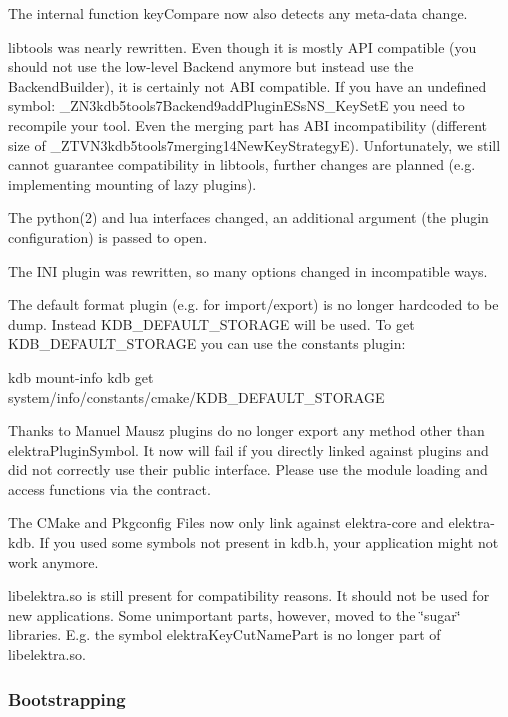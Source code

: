 The internal function {\ttfamily key\+Compare} now also detects any meta-\/data change.

libtools was nearly rewritten. Even though it is mostly A\+P\+I compatible (you should not use the low-\/level {\ttfamily Backend} anymore but instead use the {\ttfamily Backend\+Builder}), it is certainly not A\+B\+I compatible. If you have an undefined symbol\+: {\ttfamily \+\_\+\+Z\+N3kdb5tools7\+Backend9add\+Plugin\+E\+Ss\+N\+S\+\_\+Key\+Set\+E} you need to recompile your tool. Even the merging part has A\+B\+I incompatibility (different size of {\ttfamily \+\_\+\+Z\+T\+V\+N3kdb5tools7merging14\+New\+Key\+Strategy\+E}). Unfortunately, we still cannot guarantee compatibility in {\ttfamily libtools}, further changes are planned (e.\+g. implementing mounting of lazy plugins).

The python(2) and lua interfaces changed, an additional argument (the plugin configuration) is passed to {\ttfamily open}.

The I\+N\+I plugin was rewritten, so many options changed in incompatible ways.

The default format plugin (e.\+g. for import/export) is no longer hardcoded to be {\ttfamily dump}. Instead K\+D\+B\+\_\+\+D\+E\+F\+A\+U\+L\+T\+\_\+\+S\+T\+O\+R\+A\+G\+E will be used. To get K\+D\+B\+\_\+\+D\+E\+F\+A\+U\+L\+T\+\_\+\+S\+T\+O\+R\+A\+G\+E you can use the constants plugin\+: \begin{DoxyVerb}    kdb mount-info
    kdb get system/info/constants/cmake/KDB_DEFAULT_STORAGE
\end{DoxyVerb}


Thanks to Manuel Mausz plugins do no longer export any method other than {\ttfamily elektra\+Plugin\+Symbol}. It now will fail if you directly linked against plugins and did not correctly use their public interface. Please use the module loading and access functions via the contract.

The C\+Make and Pkgconfig Files now only link against {\ttfamily elektra-\/core} and {\ttfamily elektra-\/kdb}. If you used some symbols not present in {\ttfamily kdb.\+h}, your application might not work anymore.

{\ttfamily libelektra.\+so} is still present for compatibility reasons. It should not be used for new applications. Some unimportant parts, however, moved to the \char`\"{}sugar\char`\"{} libraries. E.\+g. the symbol {\ttfamily elektra\+Key\+Cut\+Name\+Part} is no longer part of {\ttfamily libelektra.\+so}.

\subsubsection*{Bootstrapping}

